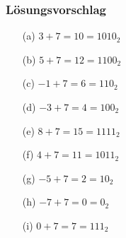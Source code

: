 \begin{frame}[t]
  \frametitle{L\"osungsvorschlag}
\smallskip


\begin{center}
\begin{minipage}{0.3\textwidth}
\begin{enumerate}
\item[(a)] $3 + 7  = 10 = 1010_2$
\item[(b)] $5 + 7  = 12 = 1100_2$
\item[(c)] $-1 + 7 = 6  = 110_2$
\end{enumerate}
\end{minipage}
\begin{minipage}{0.3\textwidth}
\begin{enumerate}
\item[(d)] $-3 + 7 = 4 = 100_2$
\item[(e)] $8 + 7 = 15 = 1111_2$
\item[(f)] $4 + 7 = 11 = 1011_2$
\end{enumerate}
\end{minipage}
\begin{minipage}{0.3\textwidth}
\begin{enumerate}
\item[(g)] $-5 + 7 = 2 = 10_2$
\item[(h)] $-7 + 7 = 0 = 0_2$
\item[(i)] $0 + 7 = 7  = 111_2$
\end{enumerate}
\end{minipage}
\end{center}

\end{frame}

